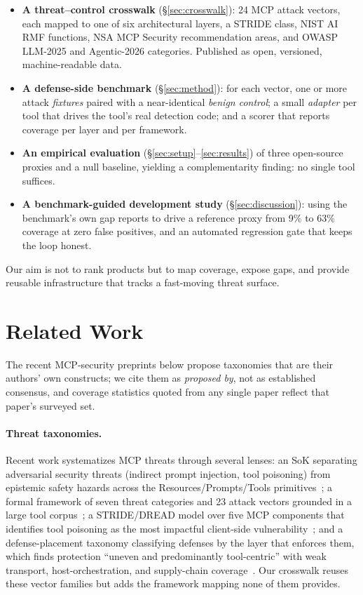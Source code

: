 \documentclass[11pt]{article}
\begin{document}
\begin{itemize}[leftmargin=1.4em,itemsep=1pt,topsep=2pt]
  \item \textbf{A threat--control crosswalk} (\S\ref{sec:crosswalk}): 24 MCP attack vectors, each mapped to one of six architectural layers, a STRIDE class, NIST AI RMF functions, NSA MCP Security recommendation areas, and OWASP LLM-2025 and Agentic-2026 categories. Published as open, versioned, machine-readable data.
  \item \textbf{A defense-side benchmark} (\S\ref{sec:method}): for each vector, one or more attack \emph{fixtures} paired with a near-identical \emph{benign control}; a small \emph{adapter} per tool that drives the tool's real detection code; and a scorer that reports coverage per layer and per framework.
  \item \textbf{An empirical evaluation} (\S\ref{sec:setup}--\ref{sec:results}) of three open-source proxies and a null baseline, yielding a complementarity finding: no single tool suffices.
  \item \textbf{A benchmark-guided development study} (\S\ref{sec:discussion}): using the benchmark's own gap reports to drive a reference proxy from 9\% to 63\% coverage at zero false positives, and an automated regression gate that keeps the loop honest.
\end{itemize}

Our aim is not to rank products but to map coverage, expose gaps, and provide reusable infrastructure that tracks a fast-moving threat surface.

\section{Related Work}
\label{sec:related}

The recent MCP-security preprints below propose taxonomies that are their authors' own constructs; we cite them as \emph{proposed by}, not as established consensus, and coverage statistics quoted from any single paper reflect that paper's surveyed set.

\paragraph{Threat taxonomies.} Recent work systematizes MCP threats through several lenses: an SoK separating adversarial security threats (indirect prompt injection, tool poisoning) from epistemic safety hazards across the Resources/Prompts/Tools primitives~\citep{sok2512}; a formal framework of seven threat categories and 23 attack vectors grounded in a large tool corpus~\citep{formal2604}; a STRIDE/DREAD model over five MCP components that identifies tool poisoning as the most impactful client-side vulnerability~\citep{stride2603}; and a defense-placement taxonomy classifying defenses by the layer that enforces them, which finds protection ``uneven and predominantly tool-centric'' with weak transport, host-orchestration, and supply-chain coverage~\citep{mcpdpt2604}. Our crosswalk reuses these vector families but adds the framework mapping none of them provides.
\end{document}
